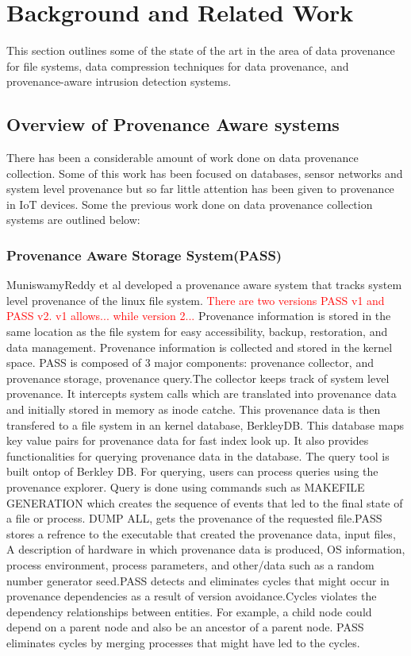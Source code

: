 


\chapter{Background and Related Work}\label{background}

This section outlines some of the state of the art in the area of data provenance for file systems, data compression techniques for data provenance, and provenance-aware intrusion detection systems.

\section{Overview of Provenance Aware systems}

There has been a considerable amount of work done on data provenance collection. Some of this work has been focused on databases, sensor networks and system level provenance but so far little attention has been given to provenance in IoT devices. Some the previous work done on data provenance collection systems are outlined below:

\subsection{Provenance Aware Storage System(PASS)}
MuniswamyReddy
et al developed a provenance aware system that tracks  system level provenance of the linux file system.\textcolor{red}{ There are two versions PASS v1 and PASS v2. v1 allows... while version 2...} Provenance information
is stored in the same location as the file system for easy accessibility, backup,
restoration, and data management. Provenance information is collected and stored in
the kernel space. PASS is composed of 3 major components: provenance collector, and provenance storage, provenance query.The collector keeps track of system level provenance. It intercepts system calls which are translated into provenance data and initially stored in memory as inode catche. This provenance data is then transfered to a file system in an kernel database, BerkleyDB. This database maps key value pairs for provenance data for fast index look up. It also provides functionalities for querying provenance data in the database. The query tool is built ontop of Berkley DB. For querying, users can process queries using the provenance explorer. Query is done using commands such as MAKEFILE  GENERATION which creates the sequence of events that led to the final state of a file or process. DUMP ALL, gets the provenance of the requested file.PASS stores a refrence to the executable that created the provenance data, input files, A description of hardware in which provenance data is produced, OS information, process environment, process parameters, and other/data such as a random number generator seed.PASS detects and eliminates cycles that might occur in provenance dependencies as a result of version avoidance.Cycles violates the dependency relationships between entities. For example, a child node could depend on a parent node and also be an ancestor of a parent node. PASS eliminates cycles by merging processes that might have led to the cycles. 

